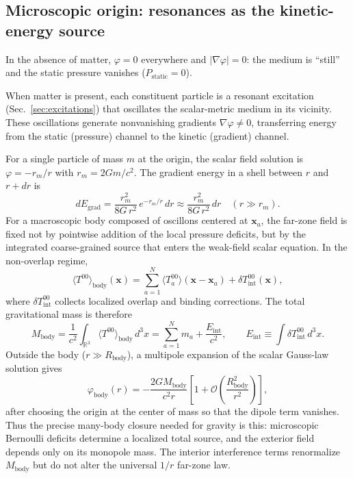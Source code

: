 \documentclass[aps,prd,onecolumn,superscriptaddress,nofootinbib,showpacs,12pt,notitlepage]{revtex4-2}
\renewcommand{\order}[1]{\mathcal{O}\!\left(#1\right)}
\begin{document}
\subsection{Microscopic origin: resonances as the kinetic-energy source}
\label{sec:micro_bernoulli}

In the absence of matter, $\varphi = 0$ everywhere and
$|\nabla\varphi| = 0$: the medium is ``still'' and the
static pressure vanishes ($P_{\mathrm{static}} = 0$).

When matter is present, each constituent particle is a
resonant excitation (Sec.~\ref{sec:excitations}) that
oscillates the scalar-metric medium in its vicinity.
These oscillations generate nonvanishing gradients
$\nabla\varphi \neq 0$, transferring energy from the
static (pressure) channel to the kinetic (gradient) channel.

For a single particle of mass $m$ at the origin, the
scalar field solution is $\varphi = -r_m/r$ with
$r_m = 2Gm/c^2$.  The gradient energy in a shell
between $r$ and $r + dr$ is
\begin{equation}\label{eq:shell_energy}
  dE_{\mathrm{grad}} = \frac{r_m^{2}}{8G\,r^{2}}\,
  e^{-r_m/r}\,dr
  \approx \frac{r_m^{2}}{8G\,r^{2}}\,dr
  \quad (r \gg r_m).
\end{equation}
For a macroscopic body composed of oscillons centered at
$\mathbf{x}_a$, the far-zone field is fixed not by pointwise
addition of the local pressure deficits, but by the integrated
coarse-grained source that enters the weak-field scalar
equation.  In the non-overlap regime,
\begin{equation}
  \langle T^{00}\rangle_{\mathrm{body}}(\mathbf{x})
  = \sum_{a=1}^{N}
    \langle T^{00}_{a}\rangle(\mathbf{x}-\mathbf{x}_a)
  + \delta T^{00}_{\mathrm{int}}(\mathbf{x}),
\end{equation}
where $\delta T^{00}_{\mathrm{int}}$ collects localized overlap
and binding corrections.  The total gravitational mass is
therefore
\begin{equation}
  M_{\mathrm{body}}
  = \frac{1}{c^2}\int_{\mathbb{R}^3}
    \langle T^{00}\rangle_{\mathrm{body}}\,d^3x
  = \sum_{a=1}^{N} m_a + \frac{E_{\mathrm{int}}}{c^2},
  \qquad
  E_{\mathrm{int}} \equiv \int \delta T^{00}_{\mathrm{int}}\,d^3x .
\end{equation}
Outside the body ($r \gg R_{\mathrm{body}}$), a multipole
expansion of the scalar Gauss-law solution gives
\begin{equation}
  \varphi_{\mathrm{body}}(r)
  = -\frac{2G M_{\mathrm{body}}}{c^2 r}
    \left[1 + \order{\frac{R_{\mathrm{body}}^2}{r^2}}\right],
\end{equation}
after choosing the origin at the center of mass so that the
dipole term vanishes.  Thus the precise many-body closure needed
for gravity is this: microscopic Bernoulli deficits determine a
localized total source, and the exterior field depends only on
its monopole mass.  The interior interference terms renormalize
$M_{\mathrm{body}}$ but do not alter the universal $1/r$
far-zone law.
\end{document}
